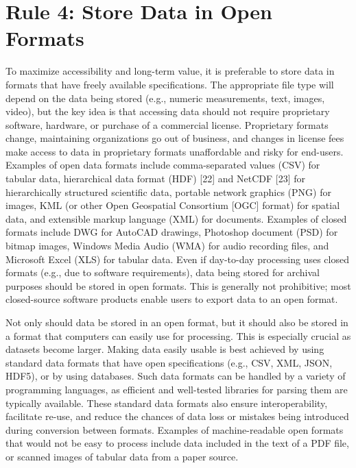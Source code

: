 \documentclass[10pt,letterpaper]{article}
\begin{document}
\section*{Rule 4: Store Data in Open
Formats}\label{rule-4-store-data-in-open-formats}

To maximize accessibility and long-term value, it is preferable to store
data in formats that have freely available specifications. The
appropriate file type will depend on the data being stored (e.g.,
numeric measurements, text, images, video), but the key idea is that
accessing data should not require proprietary software, hardware, or
purchase of a commercial license. Proprietary formats change,
maintaining organizations go out of business, and changes in license
fees make access to data in proprietary formats unaffordable and risky
for end-users. Examples of open data formats include comma-separated
values (CSV) for tabular data, hierarchical data format (HDF) {[}22{]}
and NetCDF {[}23{]} for hierarchically structured scientific data,
portable network graphics (PNG) for images, KML (or other Open
Geospatial Consortium {[}OGC{]} format) for spatial data, and extensible
markup language (XML) for documents. Examples of closed formats include
DWG for AutoCAD drawings, Photoshop document (PSD) for bitmap images,
Windows Media Audio (WMA) for audio recording files, and Microsoft Excel
(XLS) for tabular data. Even if day-to-day processing uses closed
formats (e.g., due to software requirements), data being stored for
archival purposes should be stored in open formats. This is generally
not prohibitive; most closed-source software products enable users to
export data to an open format.

Not only should data be stored in an open format, but it should also be
stored in a format that computers can easily use for processing. This is
especially crucial as datasets become larger. Making data easily usable
is best achieved by using standard data formats that have open
specifications (e.g., CSV, XML, JSON, HDF5), or by using databases. Such
data formats can be handled by a variety of programming languages, as
efficient and well-tested libraries for parsing them are typically
available. These standard data formats also ensure interoperability,
facilitate re-use, and reduce the chances of data loss or mistakes being
introduced during conversion between formats. Examples of
machine-readable open formats that would not be easy to process include
data included in the text of a PDF file, or scanned images of tabular
data from a paper source.
\end{document}
